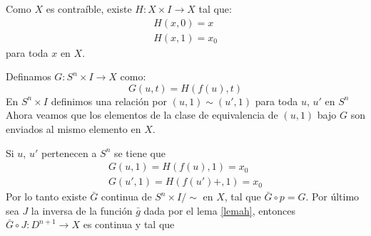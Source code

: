 \begin{Dem}

Como $X$ es contraíble, existe $H\colon X\times I \rightarrow X$ tal que:
\begin{eqnarray}
H(x,0)=x \\
H(x,1) = x_0
\end{eqnarray}
para toda $x$ en $X$.

Definamos $G\colon S^n\times I \rightarrow X$ como:
\begin{equation}
G(u,t) = H(f(u),t)
\end{equation}
En $S^n\times I$ definimos una relación por $(u,1)\sim(u',1)$ para toda $u$, $u'$ en $S^n$
Ahora veamos que los elementos de la clase de equivalencia de $(u,1)$ bajo $G$ son enviados al mismo elemento en $X$.

Si $u$, $u'$ pertenecen a $S^n$ se tiene que
\begin{eqnarray}
G(u,1) = H(f(u),1) = x_0\\
G(u',1)=H(f(u')+,1) = x_0
\end{eqnarray}
Por lo tanto existe $\bar{G}$ continua de $S^n\times I /{\sim}$ en $X$, tal que $\bar{G}\circ p = G$.
Por último sea $J$ la inversa de la función  $\bar{g}$ dada por el lema \ref{lemah}, entonces $\bar{G}\circ J \colon D^{n+1}\rightarrow X$ es continua y tal que 
\end{Dem}


